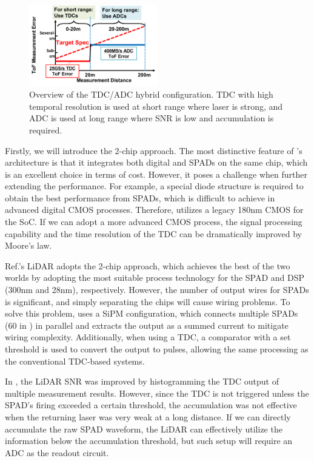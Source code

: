 \documentclass[paper]{ieice}
\begin{document}
\begin{figure}[!t]
\centering
 \includegraphics[width=0.5\textwidth]{figs/tdcadc.png}
  \caption{Overview of the TDC/ADC hybrid configuration. TDC with high temporal resolution is used at short range where laser is strong, and ADC is used at long range where SNR is low and accumulation is required.}
\label{tdcadc}
\end{figure}

\qquad Firstly, we will introduce the 2-chip approach.
The most distinctive feature of \cite{niclass20130}'s architecture is that it integrates both digital and SPADs on the same chip, which is an excellent choice in terms of cost. However, it poses a challenge when further extending the performance.
For example, a special diode structure is required to obtain the best performance from SPADs, which is difficult to achieve in advanced digital CMOS processes. Therefore, \cite{niclass20130} utilizes a legacy 180nm CMOS for the SoC. If we can adopt a more advanced CMOS process, the signal processing capability and the time resolution of the TDC can be dramatically improved by Moore's law.

Ref.\cite{yoshioka201820}'s LiDAR adopts the 2-chip approach, which achieves the best of the two worlds by adopting the most suitable process technology for the SPAD and DSP (300nm and 28nm), respectively. 
However, the number of output wires for SPADs is significant, and simply separating the chips will cause wiring problems. To solve this problem, \cite{yoshioka201820} uses a SiPM configuration, which connects multiple SPADs (60 in \cite{yoshioka201820}) in parallel and extracts the output as a summed current to mitigate wiring complexity. Additionally, when using a TDC, a comparator with a set threshold is used to convert the output to pulses, allowing the same processing as the conventional TDC-based systems.

In \cite{niclass20130}, the LiDAR SNR was improved by histogramming the TDC output of multiple measurement results.
However, since the TDC is not triggered unless the SPAD's firing exceeded a certain threshold, the accumulation was not effective when the returning laser was very weak at a long distance.
If we can directly accumulate the raw SPAD waveform, the LiDAR can effectively utilize the information below the accumulation threshold, but such setup will require an ADC as the readout circuit.
\end{document}
